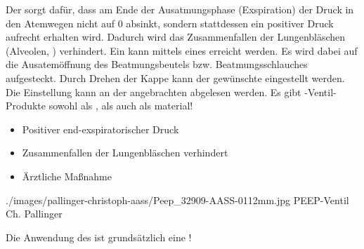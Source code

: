 \TextSlidePicture
{\TxBeschreibung{}}%
{%
\label{topic:peep-ventil}%
\label{topic:peep-basic}%
\label{topic:peep}%
Der  sorgt dafür, dass am Ende der Ausatmungsphase
(Exspiration) der Druck in den Atemwegen nicht auf 0
absinkt, sondern stattdessen ein positiver Druck aufrecht
erhalten wird. Dadurch wird das Zusammenfallen der
Lungenbläschen (Alveolen, )
verhindert.
Ein  kann mittels eines
 erreicht werden. Es wird dabei
auf die Ausatemöffnung des Beatmungsbeutels bzw.
Beatmungsschlauches aufgesteckt. Durch Drehen der Kappe kann
der gewünschte  eingestellt werden. Die
Einstellung kann an der angebrachten  abgelesen
werden.
Es gibt -Ventil-Produkte sowohl als ,
als auch als material!
}%
{%
\begin{itemize}
  \item Positiver end-exspiratorischer Druck
  \item Zusammenfallen der
  Lungenbläschen verhindert
  \item Ärztliche Maßnahme
\end{itemize}}%
{./images/pallinger-christoph-aass/Peep_32909-AASS-0112mm.jpg}%
{PEEP-Ventil}%
{}%
{Ch. Pallinger}%
{}%

\begin{Danger}
  \item Die Anwendung des  ist grundsätzlich eine
  !
\end{Danger}


\ChapterEnd


